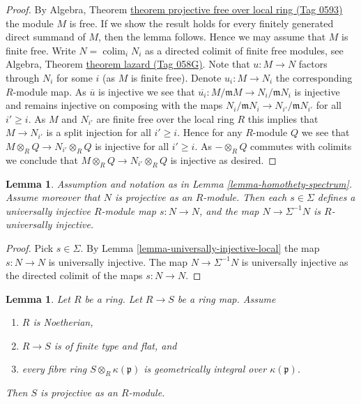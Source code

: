 \documentclass{amsart}
\theoremstyle{plain}
\newtheorem{lemma}[subsection]{Lemma}
\theoremstyle{definition}
\theoremstyle{remark}
\numberwithin{equation}{subsection}
\def\colim{\mathop{\mathrm{colim}}\nolimits}
\begin{document}
\begin{proof}
By
Algebra, Theorem \href{https://stacks.math.columbia.edu/tag/0593}{theorem projective free over local ring (Tag 0593)}
the module $M$ is free. If we show the result holds for every finitely
generated direct summand of $M$, then the lemma follows. Hence we may
assume that $M$ is finite free. Write $N = \colim_i N_i$ as
a directed colimit of finite free modules, see
Algebra, Theorem \href{https://stacks.math.columbia.edu/tag/058G}{theorem lazard (Tag 058G)}.
Note that $u : M \to N$ factors through $N_i$ for some $i$ (as $M$ is finite
free). Denote $u_i : M \to N_i$ the corresponding $R$-module map.
As $\overline{u}$ is injective we see that
$\overline{u_i} : M/\mathfrak mM \to N_i/\mathfrak mN_i$ is
injective and remains injective on composing with the maps
$N_i/\mathfrak mN_i \to N_{i'}/\mathfrak mN_{i'}$ for all $i' \geq i$.
As $M$ and $N_{i'}$ are finite free over the local ring $R$ this implies
that $M \to N_{i'}$ is a split injection for all $i' \geq i$. Hence
for any $R$-module $Q$ we see that $M \otimes_R Q \to N_{i'} \otimes_R Q$
is injective for all $i' \geq i$. As $- \otimes_R Q$ commutes with
colimits we conclude that $M \otimes_R Q \to N_{i'} \otimes_R Q$
is injective as desired.
\end{proof}


\begin{lemma}
\label{lemma-invert-universally-injective}
Assumption and notation as in
Lemma \ref{lemma-homothety-spectrum}.
Assume moreover that $N$ is projective as an $R$-module.
Then each $s \in \Sigma$ defines a
universally injective $R$-module map $s : N \to N$, and the
map $N \to \Sigma^{-1}N$ is $R$-universally injective.
\end{lemma}

\begin{proof}
Pick $s \in \Sigma$. By
Lemma \ref{lemma-universally-injective-local}
the map $s : N \to N$ is universally injective.
The map $N \to \Sigma^{-1}N$ is universally injective as the directed
colimit of the maps $s : N \to N$.
\end{proof}


\begin{lemma}
\label{lemma-fibres-irreducible-flat-projective}
Let $R$ be a ring.
Let $R \to S$ be a ring map.
Assume
\begin{enumerate}
\item $R$ is Noetherian,
\item $R \to S$ is of finite type and flat, and
\item every fibre ring $S \otimes_R \kappa(\mathfrak p)$ is
geometrically integral over $\kappa(\mathfrak p)$.
\end{enumerate}
Then $S$ is projective as an $R$-module.
\end{lemma}
\end{document}
